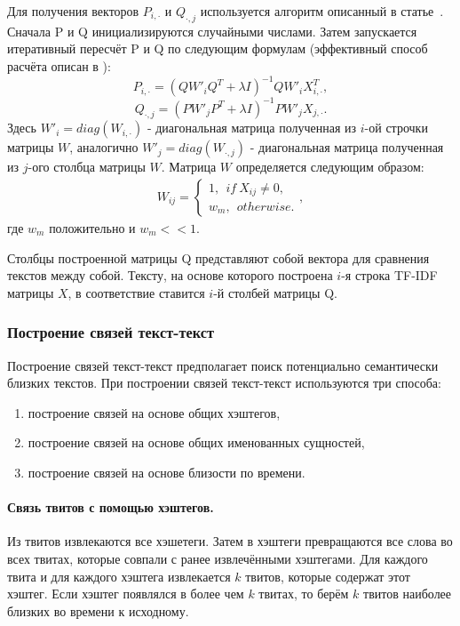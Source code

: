         Для получения векторов $P_{i,\cdot}$ и $Q_{\cdot,j}$ используется алгоритм описанный в статье~\cite{matrix_approximation}.
        Сначала P и Q инициализируются случайными числами. Затем запускается итеративный пересчёт P и Q по следующим формулам (эффективный способ расчёта описан в \cite{steck_recommender}):
        $$P_{i, \cdot} = (Q W'_i Q^T + \lambda I)^{-1} Q W'_i X_{i,\cdot}^T,$$
        $$Q_{\cdot, j} = (P W'_j P^T + \lambda I)^{-1} P W'_j X_{j,\cdot}.$$
        Здесь $W'_i = diag(W_{i, \cdot})$ - диагональная матрица полученная из $i$-ой строчки матрицы $W$,
        аналогично $W'_j = diag(W_{\cdot, j})$ - диагональная матрица полученная из $j$-ого столбца матрицы $W$.
        Матрица $W$ определяется следующим образом:
        \begin{gather}
            W_{ij} =
            \begin{cases}
                1, ~~if~X_{ij} \neq 0, \nonumber \\
                w_m, ~~otherwise.
            \end{cases},
        \end{gather}
        где $w_m$ положительно и $w_m << 1$.

        Столбцы построенной матрицы Q представляют собой вектора для сравнения текстов между собой.
        Тексту, на основе которого построена $i$-я строка TF-IDF матрицы $X$, в соответствие ставится $i$-й столбей матрицы Q.

    \subsubsection{Построение связей текст-текст}
    \label{subsubsec:linking}
        Построение связей текст-текст предполагает поиск потенциально семантически близких текстов.
         При построении связей текст-текст используются три способа:
        \begin{enumerate}
            \item построение связей на основе общих хэштегов,
            \item построение связей на основе общих именованных сущностей,
            \item построение связей на основе близости по времени.
        \end{enumerate}

        \paragraph{Связь твитов с помощью хэштегов.}
            Из твитов извлекаются все хэшетеги.
            Затем в хэштеги превращаются все слова во всех твитах, которые совпали с ранее извлечёнными хэштегами.
            Для каждого твита и для каждого хэштега извлекается $k$ твитов, которые содержат этот хэштег.
            Если хэштег появлялся в более чем $k$ твитах, то берём $k$ твитов наиболее близких во времени к исходному.

